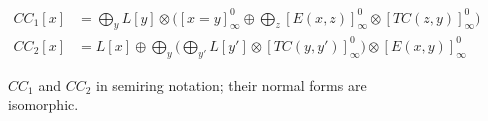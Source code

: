 \begin{figure}
\footnotesize
  \begin{align*}
    CC_{1}[x] & = \bigoplus_{y} L[y] \otimes \big([x=y]_{\infty}^{0} \oplus \bigoplus_{z} [E(x,z)]_{\infty}^{0} \otimes [TC(z,y)]_{\infty}^{0}\big) \\
    CC_{2}[x] & = L[x] \oplus \bigoplus_{y} \big( \bigoplus_{y'} L[y'] \otimes [TC(y,y')]_{\infty}^{0}\big) \otimes [E(x,y)]_{\infty}^{0}
  \end{align*}
  \caption{$CC_{1}$ and $CC_{2}$ in semiring notation; their normal
    forms are isomorphic.}
  \label{fig:cc1:semiring}
\end{figure}

